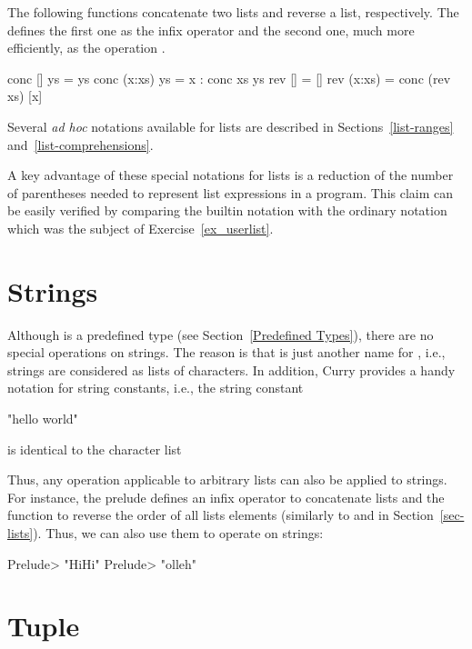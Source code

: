 The following functions concatenate two lists
and reverse a list, respectively.  
The  defines the first one as the infix operator \ccode{++}
and the second one, much more efficiently, as the operation .
%
\begin{prog}
conc []     ys = ys
conc (x:xs) ys = x : conc xs ys
\medskip
rev []     = []
rev (x:xs) = conc (rev xs) [x]
\end{prog}
%
Several \emph{ad hoc} notations available for lists are 
described in Sections~\ref{list-ranges} and~\ref{list-comprehensions}.

A key advantage of these special notations for lists is
a reduction of the number of parentheses needed to represent
list expressions in a program.
This claim can be easily verified by comparing the builtin
notation with the ordinary notation which was the subject of
Exercise~\ref{ex_userlist}.


\section{Strings}

Although  is a predefined type
(see Section~\ref{Predefined Types}), there are no special
operations on strings. The reason is that 
is just another name for \ccode {[Char]}, i.e., strings
are considered as lists of characters. In addition, Curry
provides a handy notation for string constants, i.e.,
the string constant
%
\begin{prog}
"hello world"
\end{prog}
%
is identical to the character list
%
\begin{prog}
['h','e','l','l','o',' ','w','o','r','l','d']
\end{prog}
%
Thus, any operation applicable to arbitrary lists can also be applied
to strings. For instance, the prelude defines an infix operator
\ccode{++}\pindex{++} to concatenate lists and the function
to reverse the order of all lists elements
(similarly to  and  in
Section~\ref{sec-lists}). Thus, we can also use them to operate on
strings:
%
\begin{prog}
Prelude> 
"HiHi"
Prelude> 
"olleh"
\end{prog}


\section{Tuple}

